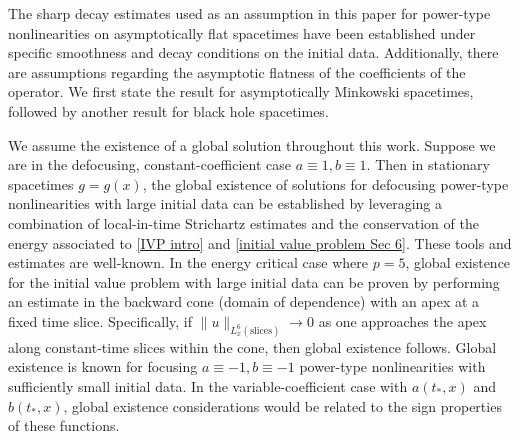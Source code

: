 \documentclass[10pt,a4paper,reqno]{amsart}
\theoremstyle{definition}
\theoremstyle{remark}
\numberwithin{equation}{section}
\begin{document}
The sharp decay estimates used as an assumption in this paper for power-type nonlinearities on asymptotically flat spacetimes have been established under specific smoothness and decay conditions on the initial data. Additionally, there are assumptions regarding the asymptotic flatness of the coefficients of the operator. We first state the result for asymptotically Minkowski spacetimes, followed by another result for black hole spacetimes.

We assume the existence of a global solution throughout this work. Suppose we are in the defocusing, constant-coefficient case $a \equiv1, b\equiv1$. Then in stationary spacetimes $g = g(x) $, the global existence of solutions for defocusing power-type nonlinearities with large initial data can be established by leveraging a combination of local-in-time Strichartz estimates and the conservation of the energy associated to \eqref{IVP intro} and \eqref{initial value problem Sec 6}. These tools and estimates are well-known. %
In the energy critical case where $p=5$, global existence for the initial value problem with large initial data can be proven by performing an estimate in the backward cone (domain of dependence) with an apex at a fixed time slice. Specifically, if $\|u\|_{L^6_x(\text{slices})} \to 0$ as one approaches the apex along constant-time slices within the cone, then global existence follows. %
Global existence is known for focusing $a\equiv-1, b \equiv -1$ power-type nonlinearities with sufficiently small initial data. %
In the variable-coefficient case with $a(t_*,x)$ and $b(t_*,x)$, global existence considerations would be related to the sign properties of these functions.
\end{document}
